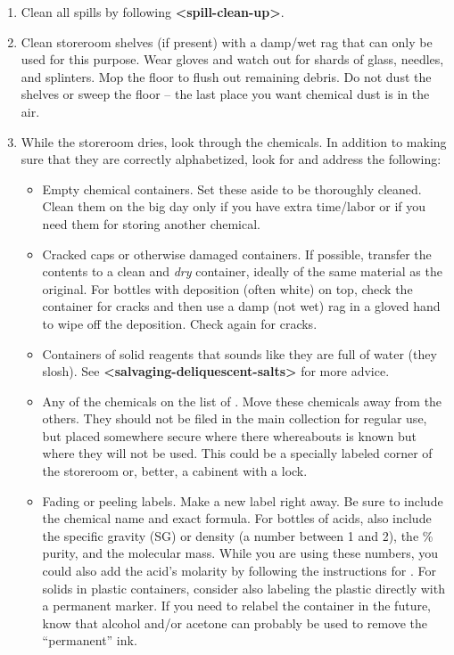 \begin{enumerate}
\item{Clean all spills by following \textbf{\textless spill-clean-up\textgreater }.}
\item{Clean storeroom shelves (if present) with a damp/wet rag that can only be used for this purpose. Wear gloves and watch out for shards of glass, needles, and splinters. Mop the floor to flush out remaining debris. Do not dust the shelves or sweep the floor -- the last place you want chemical dust is in the air.}
\item{While the storeroom dries, look through the chemicals. In addition to making sure that they are correctly alphabetized, look for and address the following:
\begin{itemize}
\item{Empty chemical containers. Set these aside to be thoroughly cleaned. Clean them on the big day only if you have extra time/labor or if you need them for storing another chemical.}
\item{Cracked caps or otherwise damaged containers. If possible, transfer the contents to a clean and \textit{dry} container, ideally of the same material as the original. For bottles with deposition (often white) on top, check the container for cracks and then use a damp (not wet) rag in a gloved hand to wipe off the deposition. Check again for cracks.}
\item{Containers of solid reagents that sounds like they are full of water (they slosh). See \textbf{\textless salvaging-deliquescent-salts\textgreater } for more advice.}
\item{Any of the chemicals on the list of . Move these chemicals away from the others. They should not be filed in the main collection for regular use, but placed somewhere secure where there whereabouts is known but where they will not be used. This could be a specially labeled corner of the storeroom or, better, a cabinent with a lock.}
\item{Fading or peeling labels. Make a new label right away. Be sure to include the chemical name and exact formula. For bottles of acids, also include the specific gravity (SG) or density (a number between 1 and 2), the \% purity, and the molecular mass. While you are using these numbers, you could also add the acid's molarity by following the instructions for . For solids in plastic containers, consider also labeling the plastic directly with a permanent marker. If you need to relabel the container in the future, know that alcohol and/or acetone can probably be used to remove the ``permanent'' ink.}

\end{itemize}}
\end{enumerate}
